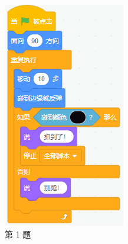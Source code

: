 \documentclass[10pt, a4paper]{article}
\begin{document}
\begin{enumerate}
\begin{figure}[htbp]
\begin{minipage}[t]{.3\textwidth}
\begin{minipage}[t]{.45\textwidth}
                    \includegraphics[width=\textwidth]{figure/1-2.png}
                \end{minipage}
                \caption*{第 1 题}
            \end{minipage}
            \begin{minipage}[t]{.4\textwidth}
                \centering
                \begin{minipage}[t]{.36\textwidth}

\end{minipage}
\end{minipage}
\end{figure}
\end{enumerate}
\end{document}
